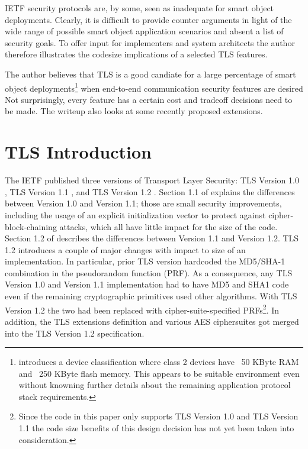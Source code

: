 \documentclass[a4paper, 10pt]{IEEEtran}
\begin{document}
IETF security protocols are, by some, seen as inadequate for smart object deployments. Clearly, it is difficult to provide counter arguments in light of the wide range of possible smart object application scenarios and absent a list of security goals. To offer input for implementers and system architects the author therefore illustrates the codesize implications of a selected TLS features. 

The author believes that TLS is a good candiate for a large percentage of smart object deployments\footnote{\cite{I-D.bormann-lwig-guidance} introduces a device classification where class 2 devices have ~50 KByte RAM and ~250 KByte flash memory. This appears to be suitable environment even without knowning further details about the remaining application protocol stack requirements.} when end-to-end communication security features are desired Not surprisingly, every feature has a certain cost and tradeoff decisions need to be made. The writeup also looks at some recently proposed extensions. 



\section{TLS Introduction}

The IETF published three versions of Transport Layer Security: TLS Version 1.0 \cite{rfc2246}, TLS Version 1.1 \cite{rfc4346}, and TLS Version 1.2 \cite{rfc5246}. Section 1.1 of  \cite{rfc4346} explains the differences between Version 1.0 and Version 1.1; those are small security improvements, including the usage of an explicit initialization vector to protect against cipher-block-chaining attacks, which all have little impact for the size of the code. Section 1.2 of \cite{rfc5246} describes the differences between Version 1.1 and Version 1.2. TLS 1.2 introduces a couple of major changes with impact to size of an implementation. In particular, prior TLS version hardcoded the MD5/SHA-1 combination in the pseudorandom function (PRF). As a consequence, any TLS Version 1.0 and Version 1.1 implementation had to have MD5 and SHA1 code even if the remaining cryptographic primitives used other algorithms. With TLS Version 1.2 the two had been replaced with cipher-suite-specified PRFs\footnote{Since the code in this paper only supports TLS Version 1.0 and TLS Version 1.1 the code size benefits of this design decision has not yet been taken into consideration.}. In addition, the TLS extensions definition \cite{rfc6066} and various AES ciphersuites \cite{rfc3268} got merged into the TLS Version 1.2 specification.
\end{document}
